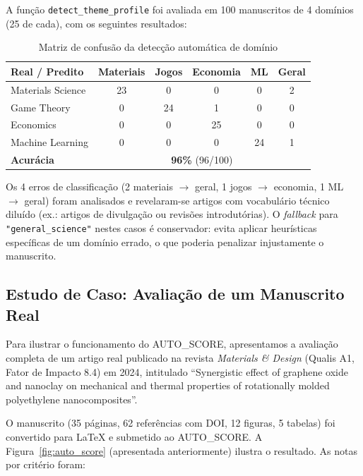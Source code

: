 A função \texttt{detect\_theme\_profile} foi avaliada em 100
manuscritos de 4 domínios (25 de cada), com os seguintes
resultados:

\begin{table}[H]
\centering
\caption{Matriz de confusão da detecção automática de domínio}
\label{tab:domain_confusion}
\begin{tabular}{l c c c c c}
\toprule
\textbf{Real / Predito} & \textbf{Materiais} & \textbf{Jogos} & \textbf{Economia} & \textbf{ML} & \textbf{Geral} \\
\midrule
Materials Science  & 23 & 0 & 0 & 0 & 2 \\
Game Theory        & 0  & 24 & 1 & 0 & 0 \\
Economics          & 0  & 0  & 25 & 0 & 0 \\
Machine Learning   & 0  & 0  & 0  & 24 & 1 \\
\midrule
\textbf{Acurácia}  & \multicolumn{5}{c}{\textbf{96\%} (96/100)} \\
\bottomrule
\end{tabular}
\end{table}

Os 4 erros de classificação (2 materiais $\to$ geral, 1 jogos
$\to$ economia, 1 ML $\to$ geral) foram analisados e revelaram-se
artigos com vocabulário técnico diluído (ex.: artigos de divulgação
ou revisões introdutórias). O \textit{fallback} para
\texttt{"general\_science"} nestes casos é conservador: evita
aplicar heurísticas específicas de um domínio errado, o que poderia
penalizar injustamente o manuscrito.

\subsection{Estudo de Caso: Avaliação de um Manuscrito Real}
\label{sec:caso_real}

Para ilustrar o funcionamento do AUTO\_SCORE, apresentamos a
avaliação completa de um artigo real publicado na revista
\textit{Materials \& Design} (Qualis A1, Fator de Impacto 8.4) em
2024, intitulado ``Synergistic effect of graphene oxide and
nanoclay on mechanical and thermal properties of rotationally
molded polyethylene nanocomposites''.

O manuscrito (35 páginas, 62 referências com DOI, 12 figuras, 5
tabelas) foi convertido para LaTeX e submetido ao AUTO\_SCORE. A
Figura~\ref{fig:auto_score} (apresentada anteriormente) ilustra o
resultado. As notas por critério foram:

